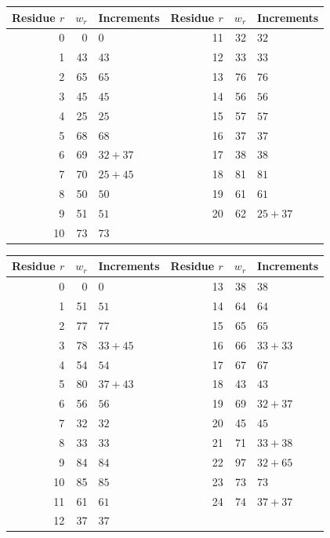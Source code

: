 \documentclass[10pt]{article}
\numberwithin{equation}{section}
\begin{document}
\begin{center}
\begin{minipage}[t]{0.485\linewidth}
\centering
{}\label{finite:tab:residues-9}
\smallskip\small
\begin{tabular}{@{}rrl@{\hspace{0.65em}}rrl@{}}
\toprule
Residue $r$&$w_r$&Increments&Residue $r$&$w_r$&Increments\\\midrule
0 & 0 & $0$ & 11 & 32 & $32$\\
1 & 43 & $43$ & 12 & 33 & $33$\\
2 & 65 & $65$ & 13 & 76 & $76$\\
3 & 45 & $45$ & 14 & 56 & $56$\\
4 & 25 & $25$ & 15 & 57 & $57$\\
5 & 68 & $68$ & 16 & 37 & $37$\\
6 & 69 & $32+37$ & 17 & 38 & $38$\\
7 & 70 & $25+45$ & 18 & 81 & $81$\\
8 & 50 & $50$ & 19 & 61 & $61$\\
9 & 51 & $51$ & 20 & 62 & $25+37$\\
10 & 73 & $73$ &  &  & \\
\bottomrule
\end{tabular}
\end{minipage}\hfill
\begin{minipage}[t]{0.485\linewidth}
\centering
{}\label{finite:tab:residues-10}
\smallskip\small
\begin{tabular}{@{}rrl@{\hspace{0.65em}}rrl@{}}
\toprule
Residue $r$&$w_r$&Increments&Residue $r$&$w_r$&Increments\\\midrule
0 & 0 & $0$ & 13 & 38 & $38$\\
1 & 51 & $51$ & 14 & 64 & $64$\\
2 & 77 & $77$ & 15 & 65 & $65$\\
3 & 78 & $33+45$ & 16 & 66 & $33+33$\\
4 & 54 & $54$ & 17 & 67 & $67$\\
5 & 80 & $37+43$ & 18 & 43 & $43$\\
6 & 56 & $56$ & 19 & 69 & $32+37$\\
7 & 32 & $32$ & 20 & 45 & $45$\\
8 & 33 & $33$ & 21 & 71 & $33+38$\\
9 & 84 & $84$ & 22 & 97 & $32+65$\\
10 & 85 & $85$ & 23 & 73 & $73$\\
11 & 61 & $61$ & 24 & 74 & $37+37$\\
12 & 37 & $37$ &  &  & \\
\bottomrule
\end{tabular}
\end{minipage}
\end{center}
\end{document}
